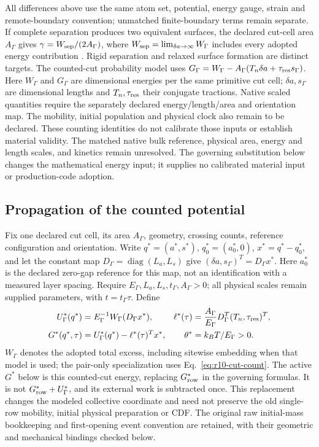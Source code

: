 \documentclass[11pt]{article}
\begin{document}
All differences above use the same atom set, potential, energy gauge,
strain and remote-boundary convention; unmatched finite-boundary terms
remain separate.  If complete separation produces two equivalent
surfaces, the declared cut-cell area $A_\Gamma$ gives
$\gamma=W_{\rm sep}/(2A_\Gamma)$, where
$W_{\rm sep}=\lim_{\delta a\to\infty}W_\Gamma$ includes every adopted
energy contribution \cite{HaleSurfaceEnergyStatic}.
Rigid separation and relaxed surface formation are distinct targets.
The counted-cut probability model uses
$G_\Gamma=W_\Gamma-A_\Gamma(T_n\delta a+\tau_{\rm res}s_\Gamma)$.
Here $W_\Gamma$ and $G_\Gamma$ are dimensional energies per the same
primitive cut cell; $\delta a,s_\Gamma$ are dimensional lengths and
$T_n,\tau_{\rm res}$ their conjugate tractions.  Native scaled quantities
require the separately declared energy/length/area and orientation map.
The mobility, initial population and physical clock also remain to be declared.
These counting identities do not calibrate those inputs or establish
material validity.  The matched native bulk reference, physical area,
energy and length scales, and kinetics remain unresolved.
The governing substitution below changes the mathematical energy input;
it supplies no calibrated material input or production-code adoption.



\subsection{Propagation of the counted potential}
\label{sec:r11-propagation}
Fix one declared cut cell, its area $A_\Gamma$, geometry, crossing counts,
reference configuration and orientation. Write $q^*=(a^*,s^*)$,
$q_0^*=(a_0^*,0)$, $x^*=q^*-q_0^*$, and let the constant map
$D_\Gamma=\operatorname{diag}(L_a,L_s)$ give
$(\delta a,s_\Gamma)^T=D_\Gamma x^*$. Here $a_0^*$ is the declared
zero-gap reference for this map, not an identification with a measured
layer spacing. Require $E_\Gamma,L_a,L_s,t_\Gamma,A_\Gamma>0$;
all physical scales remain supplied parameters, with $t=t_\Gamma\tau$.
Define
\begin{align}
 U_\Gamma^*(q^*)&=E_\Gamma^{-1}W_\Gamma(D_\Gamma x^*),&
 \ell^*(\tau)&=\frac{A_\Gamma}{E_\Gamma}D_\Gamma^T
       (T_n,\tau_{\rm res})^T,\nonumber\\
 G^*(q^*,\tau)&=U_\Gamma^*(q^*)-\ell^*(\tau)^Tx^*,&
 \theta^*&=k_BT/E_\Gamma>0 .
 \label{eq:r11-selected-energy}
\end{align}
$W_\Gamma$ denotes the adopted total excess, including sitewise embedding
when that model is used; the pair-only specialization uses
Eq.~\eqref{eq:r10-cut-count}. The active $G^*$ below is this counted-cut
energy, replacing $G_{\rm row}^*$ in the governing formulas. It is not
$G_{\rm row}^*+U_\Gamma^*$, and its external work is subtracted once.
This replacement changes the modeled collective coordinate and need not
preserve the old single-row mobility, initial physical preparation or CDF.
The original raw initial-mass bookkeeping and first-opening event convention
are retained, with their geometric and mechanical bindings checked below.
\end{document}
